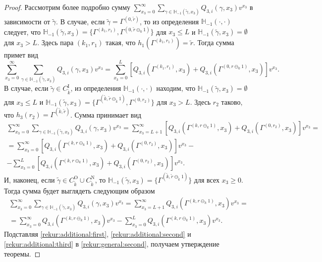 \documentclass[a4paper,12pt,russian]{extarticle}
\begin{document}
\begin{proof}
Рассмотрим более подробно сумму $\sum_{x_3=0}^{\infty} \sum_{\gamma \in {\mathbb H}_{-1}(\tilde{\gamma},x_3)} Q_{3,i}(\gamma,x_3) v^{x_3}$ в зависимости от $\tilde{\gamma}$.
В случае, если $\tilde{\gamma} = \Gamma^{(0,\tilde{r})}$, то из определения ${\mathbb H}_{-1}(\cdot,\cdot)$ следует, что ${\mathbb H}_{-1}(\tilde{\gamma},x_3) = \{\Gamma^{(k_1,r_1)}, \Gamma^{(0,\tilde{r}\ominus_0 1)}\}$ для $x_3 \leqslant L$ и
${\mathbb H}_{-1}(\tilde{\gamma},x_3) =\emptyset$ для $x_3 > L$. Здесь пара $(k_1,r_1)$ такая, что $h_1(\Gamma^{(k_1,r_1)}) = \tilde{r}$. Тогда сумма примет вид
\begin{equation}
\sum_{x_3=0}^{\infty} \sum_{\gamma \in {\mathbb H}_{-1}(\tilde{\gamma},x_3)} Q_{3,i}(\gamma,x_3) v^{x_3} = \sum_{x_3=0}^{L} \left[ Q_{3,i}(\Gamma^{(k_1,r_1)},x_3) + Q_{3,i}(\Gamma^{(0,r\ominus_0 1)},x_3) \right] v^{x_3}.
\label{rekur:additional:first}
\end{equation}
В случае, если $\tilde{\gamma} \in C_{\tilde{k}}^{\mathrm{I}}$, из определения  ${\mathbb H}_{-1}(\cdot,\cdot)$ находим, что ${\mathbb H}_{-1}(\tilde{\gamma},x_3) = \emptyset$ для $x_3 \leqslant L$ и ${\mathbb H}_{-1}(\tilde{\gamma},x_3) = \{\Gamma^{(\tilde{k},\tilde{r}\ominus_{\tilde{k}} 1)}, \Gamma^{(0,r_2)}\}$ для $x_3 > L$. Здесь $r_2$ таково, что $h_3(r_2)=\Gamma^{(\tilde{k},\tilde{r})}$. Сумма принимает вид
\begin{multline}
\sum_{x_3=0}^{\infty} \sum_{\gamma \in {\mathbb H}_{-1}(\tilde{\gamma},x_3)} Q_{3,i}(\gamma,x_3) v^{x_3} = \sum_{x_3=L+1}^{\infty} \left[ Q_{3,i}(\Gamma^{(k,r\ominus_k 1)},x_3) + Q_{3,i}(\Gamma^{(0,r_2)},x_3) \right] v^{x_3} = \\=
\sum_{x_3=0}^{\infty} \left[ Q_{3,i}(\Gamma^{(k,r\ominus_k 1)},x_3) + Q_{3,i}(\Gamma^{(0,r_2)},x_3) \right] v^{x_3} -\\
-\sum_{x_3=0}^{L} \left[ Q_{3,i}(\Gamma^{(k,r\ominus_k 1)},x_3) + Q_{3,i}(\Gamma^{(0,r_2)},x_3) \right] v^{x_3}.
\label{rekur:additional:second}
\end{multline}
И, наконец, если $\tilde{\gamma}\in C_{\tilde{k}}^{\mathrm{O}} \cup C_{\tilde{k}}^{\mathrm{N}}$, то ${\mathbb H}_{-1}(\tilde{\gamma},x_3) = \{\Gamma^{(\tilde{k},\tilde{r}\ominus_{\tilde{k}} 1)}\}$ для всех $x_3\geqslant 0$. Тогда сумма будет выглядеть следующим образом
\begin{multline}
\sum_{x_3=0}^{\infty} \sum_{\gamma \in {\mathbb H}_{-1}(\tilde{\gamma},x_3)} Q_{3,i}(\gamma,x_3) v^{x_3} = \sum_{x_3=L+1}^{\infty} Q_{3,i}(\Gamma^{(k,r\ominus_k 1)},x_3) v^{x_3} =\\=
\sum_{x_3=0}^{\infty} Q_{3,i}(\Gamma^{(k,r\ominus_k 1)},x_3) v^{x_3} - \sum_{x_3=0}^{L} Q_{3,i}(\Gamma^{(k,r\ominus_k 1)},x_3) v^{x_3}.
\label{rekur:additional:third}
\end{multline}
Подставляя \eqref{rekur:additional:first}, \eqref{rekur:additional:second} и \eqref{rekur:additional:third} в \eqref{rekur:general:second}, получаем утверждение теоремы.
\end{proof}
\end{document}
